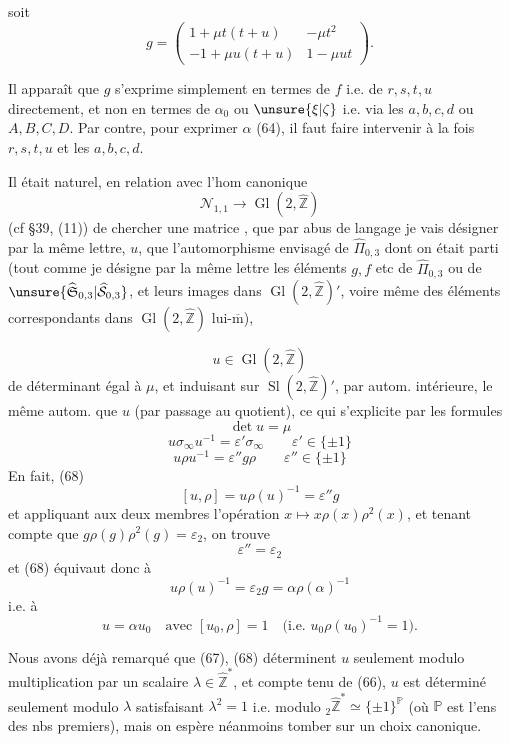 soit
\[
\tag{65}
g=\begin{pmatrix}1+\mu t(t+u)&-\mu t^2\\-1+\mu u(t+u)&1-\mu ut\end{pmatrix}.
\]

Il apparaît que $g$ s'exprime simplement en termes de $f$ i.e. de $r,s,t,u$ directement, et non en termes de $\alpha_0$ ou $\unsure{\xi|\zeta}$ i.e. via les $a,b,c,d$ ou $A,B,C,D$. Par contre, pour exprimer $\alpha$ (64), il faut faire intervenir à la fois  $r,s,t,u$ et les $a,b,c,d$.

Il était naturel, en relation avec l'hom canonique
\[
\mathcal N_{1,1}\longrightarrow\operatorname{Gl}(2,\widehat{\mathbb Z})
\]
(cf \S39, (11)) de chercher une matrice , que par abus de langage je vais désigner par la même lettre, $u$, que l'automorphisme envisagé de $\widehat\Pi_{0,3}$ dont on était parti (tout comme je désigne par la même lettre les éléments $g,f$ etc de $\widehat\Pi_{0,3}$ ou de $\unsure{\widehat{\mathfrak S}_{0,3}|\widehat{\mathcal S}_{0,3}}$, et leurs images dans $\operatorname{Gl}(2,\widehat{\mathbb Z})'$, voire même des éléments correspondants dans $\operatorname{Gl}(2,\widehat{\mathbb Z})$ lui-$\overline{\mathrm m}$),

\[
u\in\operatorname{Gl}(2,\widehat{\mathbb Z})
\]
 de déterminant égal à $\mu$, et induisant sur $\operatorname{Sl}(2,\widehat{\mathbb Z})'$, par autom. intérieure, le même autom. que  $u$  (par passage au quotient), ce qui s'explicite par les formules
\[
\tag{66}\det u=\mu
\]
\[
\tag{67}u\sigma_\infty u^{-1}=\varepsilon'\sigma_\infty\qquad\varepsilon'\in\{\pm1\}
\]
\[
\tag{68}u\rho u^{-1}=\varepsilon''g\rho\qquad\varepsilon''\in\{\pm1\}
\]
En fait,  (68)  
\[
[u,\rho]=u\rho(u)^{-1}=\varepsilon''g
\]
et appliquant aux deux membres l'opération $x\mapsto x\rho(x)\rho^2(x)$, et tenant compte que $g\rho(g)\rho^2(g)=\varepsilon_2$,   on trouve
\[
\tag{68 bis}\varepsilon''=\varepsilon_2
\]
et (68) équivaut donc à
\[
u\rho(u)^{-1}=\varepsilon_2g=\alpha\rho(\alpha)^{-1}
\]
 i.e. à
\[
\tag{69}u=\alpha u_0\quad\text{avec }[u_0,\rho]=1
\quad\bigl(\text{i.e. }u_0\rho(u_0)^{-1}=1\bigr).
\]

Nous avons déjà remarqué que (67), (68) déterminent $u$ seulement modulo multiplication par un scalaire $\lambda\in\widehat{\mathbb Z}^*$, et compte tenu de (66), $u$ est déterminé seulement modulo $\lambda$ satisfaisant $\lambda^2=1$ i.e. modulo ${}_2\widehat{\mathbb Z}^*\simeq\{\pm1\}^{\mathbb P}$ (où $\mathbb P$ est l'ens des nbs premiers), mais on espère néanmoins tomber sur un choix canonique.

